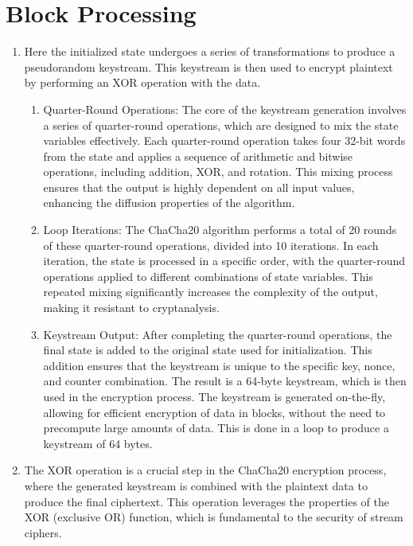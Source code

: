 \documentclass[a4paper,12pt]{report}
\begin{document}
\section{Block Processing}
\begin{enumerate}
    \item Here the initialized state undergoes a series of transformations to produce a pseudorandom keystream.
    This keystream is then used to encrypt plaintext by performing an XOR operation with the data.

\begin{enumerate}
    \item Quarter-Round Operations: The core of the keystream generation involves a series of quarter-round operations, which are designed to mix the state variables effectively.
    Each quarter-round operation takes four 32-bit words from the state and applies a sequence of arithmetic and bitwise operations, including addition, XOR, and rotation.
    This mixing process ensures that the output is highly dependent on all input values, enhancing the diffusion properties of the algorithm.
    \item Loop Iterations: The ChaCha20 algorithm performs a total of 20 rounds of these quarter-round operations, divided into 10 iterations.
    In each iteration, the state is processed in a specific order, with the quarter-round operations applied to different combinations of state variables.
    This repeated mixing significantly increases the complexity of the output, making it resistant to cryptanalysis.
    \item Keystream Output: After completing the quarter-round operations, the final state is added to the original state used for initialization.
    This addition ensures that the keystream is unique to the specific key, nonce, and counter combination.
    The result is a 64-byte keystream, which is then used in the encryption process.
    The keystream is generated on-the-fly, allowing for efficient encryption of data in blocks, without the need to precompute large amounts of data.
    This is done in a loop to produce a keystream of 64 bytes.
    \end{enumerate}

    \item The XOR operation is a crucial step in the ChaCha20 encryption process, where the generated keystream is combined with the plaintext data to produce the final ciphertext. This operation leverages the properties of the XOR (exclusive OR) function, which is fundamental to the security of stream ciphers.


\end{enumerate}
\end{document}
